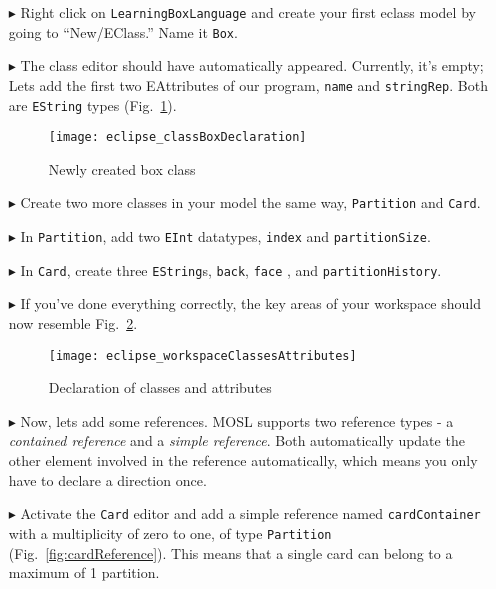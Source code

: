 \begin{itemize}
\item[$\blacktriangleright$] Right click on \texttt{LearningBoxLanguage} and create your first eclass model by going to ``New/EClass.'' Name it \texttt{Box}.

\item[$\blacktriangleright$] The class editor should have automatically appeared. Currently, it's empty; Lets add the first two EAttributes of our program,
\texttt{name} and \texttt{stringRep}. Both are \texttt{EString} types (Fig.~\ref{fig:boxDeclaration}).

\begin{figure}[htbp]
	\centering
  \texttt{[image: eclipse\_classBoxDeclaration]}
	\caption{Newly created box class}
	\label{fig:boxDeclaration}
\end{figure} 

\item[$\blacktriangleright$] Create two more classes in your model the same way, \texttt{Partition} and \texttt{Card}.

\item[$\blacktriangleright$] In \texttt{Partition}, add two \texttt{EInt} datatypes, \texttt{index} and \texttt{partitionSize}.

\item[$\blacktriangleright$] In \texttt{Card}, create three \texttt{EString}s, \texttt{back}, \texttt{face} , and \texttt{partitionHistory}.

\item[$\blacktriangleright$] If you've done everything correctly, the key areas of your workspace should now resemble Fig.~\ref{fig:workspaceClassAttributes}.

\begin{figure}[htbp]
	\centering
  \texttt{[image: eclipse\_workspaceClassesAttributes]}
	\caption{Declaration of classes and attributes}
	\label{fig:workspaceClassAttributes}
\end{figure} 

\item[$\blacktriangleright$] Now, lets add some references. MOSL supports two reference types - a \emph{contained reference} and a \emph{simple reference}. Both
automatically update the other element involved in the reference automatically, which means you only have to declare a direction once.

\item[$\blacktriangleright$] Activate the \texttt{Card} editor and add a simple reference named \texttt{cardContainer} with a multiplicity of zero to one, of
type \texttt{Partition} (Fig.~\ref{fig:cardReference}). This means that a single card can belong to a maximum of 1 partition.


\end{itemize}
